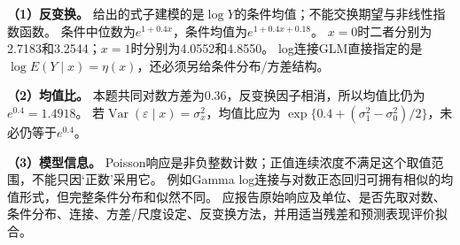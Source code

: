 \textbf{（1）反变换。} 给出的式子建模的是$\log Y$的条件均值；不能交换期望与非线性指数函数。
条件中位数为$e^{1+0.4x}$，条件均值为$e^{1+0.4x+0.18}$。
$x=0$时二者分别为2.7183和3.2544；$x=1$时分别为4.0552和4.8550。
log连接GLM直接指定的是$\log E(Y\mid x)=\eta(x)$，还必须另给条件分布/方差结构。
\par\textbf{（2）均值比。} 本题共同对数方差为0.36，反变换因子相消，所以均值比仍为$e^{0.4}=1.4918$。
若$\operatorname{Var}(\varepsilon\mid x)=\sigma_x^2$，均值比应为
$\exp\{0.4+(\sigma_1^2-\sigma_0^2)/2\}$，未必仍等于$e^{0.4}$。
\par\textbf{（3）模型信息。} Poisson响应是非负整数计数；正值连续浓度不满足这个取值范围，不能只因‘正数’采用它。
例如Gamma log连接与对数正态回归可拥有相似的均值形式，但完整条件分布和似然不同。
应报告原始响应及单位、是否先取对数、条件分布、连接、方差/尺度设定、反变换方法，并用适当残差和预测表现评价拟合。
\par\nobreak\smallskip{}

